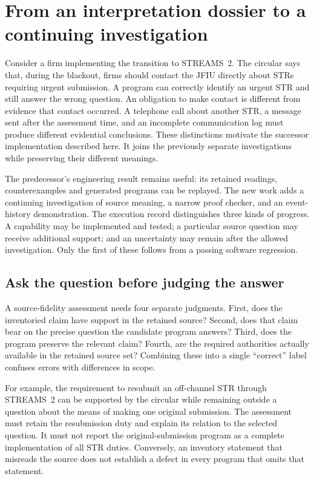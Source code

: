 \section{From an interpretation dossier to a continuing investigation}
\label{sec:successor-assurance}

Consider a firm implementing the transition to STREAMS~2. The circular says
that, during the blackout, firms should contact the JFIU directly about STRs
requiring urgent submission. A program can correctly identify an urgent STR
and still answer the wrong question. An obligation to make contact is different
from evidence that contact occurred. A telephone call about another STR, a
message sent after the assessment time, and an incomplete communication log
must produce different evidential conclusions. These distinctions motivate
the successor implementation described here. It joins the previously separate
investigations while preserving their different meanings.

The predecessor's engineering result remains useful: its retained readings,
counterexamples and generated programs can be replayed. The new work adds a
continuing investigation of source meaning, a narrow proof checker, and an
event-history demonstration. The execution record distinguishes three kinds
of progress. A capability may be implemented and tested; a particular source
question may receive additional support; and an uncertainty may remain after
the allowed investigation. Only the first of these follows from a passing
software regression.

\subsection{Ask the question before judging the answer}

A source-fidelity assessment needs four separate judgments. First, does the
inventoried claim have support in the retained source? Second, does that claim
bear on the precise question the candidate program answers? Third, does the
program preserve the relevant claim? Fourth, are the required authorities
actually available in the retained source set? Combining these into a single
``correct'' label confuses errors with differences in scope.

For example, the requirement to resubmit an off-channel STR through STREAMS~2
can be supported by the circular while remaining outside a question about the
means of making one original submission. The assessment must retain the
resubmission duty and explain its relation to the selected question. It must
not report the original-submission program as a complete implementation of
all STR duties. Conversely, an inventory statement that misreads the source
does not establish a defect in every program that omits that statement.


